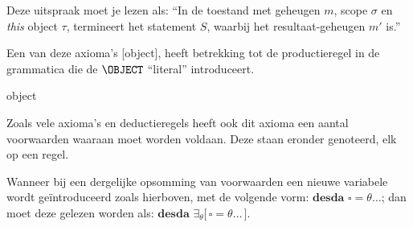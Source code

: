 





Deze uitspraak moet je lezen als: ``In de toestand met geheugen $m$, scope $\sigma$ en \emph{this} object $\tau$, termineert het statement $S$, waarbij het resultaat-geheugen $m'$ is.''

Een van deze axioma's [object], heeft betrekking tot de productieregel in de grammatica die de $\OBJECT$ ``literal'' introduceert.

\begin{NSAxiom}{object}
  \begin{prooftree}
  \end{prooftree}
  \begin{NSConditions}
  \end{NSConditions}
\end{NSAxiom}

Zoals vele axioma's en deductieregels heeft ook dit axioma een aantal voorwaarden waaraan moet worden voldaan. Deze staan eronder genoteerd, elk op een regel.

Wanneer bij een dergelijke opsomming van voorwaarden een nieuwe variabele wordt geïntroduceerd zoals hierboven, met de volgende vorm: $\textbf{desda } \square = \theta \dots$; dan moet deze gelezen worden als: $\textbf{desda } \exists_\theta \big[\, \square = \theta \dots \,\big]$.


